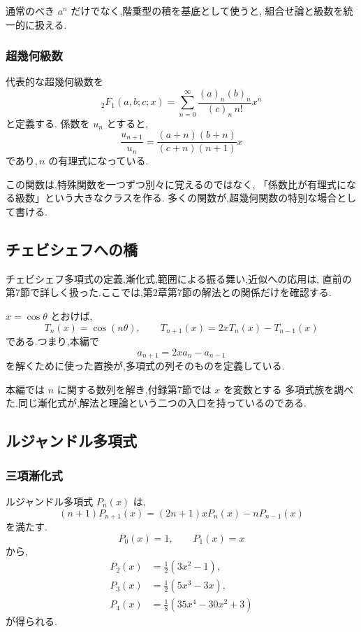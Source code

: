 通常のべき $a^n$ だけでなく,階乗型の積を基底として使うと,
組合せ論と級数を統一的に扱える.

\subsubsection{超幾何級数}

代表的な超幾何級数を
\[
  {}_2F_1(a,b;c;x)
  =
  \sum_{n=0}^{\infty}
  \frac{(a)_n(b)_n}{(c)_n\,n!}x^n
\]
と定義する.
係数を $u_n$ とすると,
\[
  \frac{u_{n+1}}{u_n}
  =
  \frac{(a+n)(b+n)}{(c+n)(n+1)}x
\]
であり,\,$n$ の有理式になっている.

この関数は,特殊関数を一つずつ別々に覚えるのではなく,
「係数比が有理式になる級数」という大きなクラスを作る.
多くの関数が,超幾何関数の特別な場合として書ける.

\subsection{チェビシェフへの橋}

チェビシェフ多項式の定義,漸化式,範囲による振る舞い,近似への応用は,
直前の第7節で詳しく扱った.ここでは,第2章第7節の解法との関係だけを確認する.

$x=\cos\theta$ とおけば,
\[
  T_n(x)=\cos(n\theta),
  \qquad
  T_{n+1}(x)=2xT_n(x)-T_{n-1}(x)
\]
である.つまり,本編で
\[
  a_{n+1}=2x a_n-a_{n-1}
\]
を解くために使った置換が,多項式の列そのものを定義している.

本編では $n$ に関する数列を解き,付録第7節では $x$ を変数とする
多項式族を調べた.同じ漸化式が,解法と理論という二つの入口を持っているのである.

\subsection{ルジャンドル多項式}

\subsubsection{三項漸化式}

ルジャンドル多項式 $P_n(x)$ は,
\[
  (n+1)P_{n+1}(x)
  =(2n+1)xP_n(x)-nP_{n-1}(x)
\]
を満たす.
\[
  P_0(x)=1,\qquad P_1(x)=x
\]
から,
\[
\begin{aligned}
  P_2(x)&=\frac12(3x^2-1),\\
  P_3(x)&=\frac12(5x^3-3x),\\
  P_4(x)&=\frac18(35x^4-30x^2+3)
\end{aligned}
\]
が得られる.

